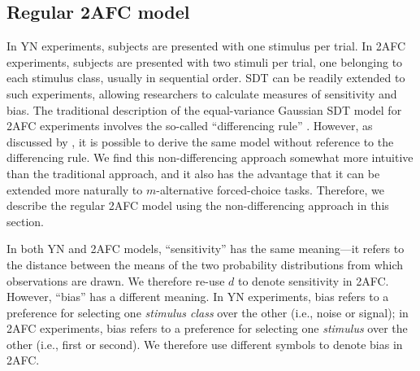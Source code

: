 \documentclass[man]{apa6}
\begin{document}
\subsection{Regular 2AFC model}
In YN experiments, subjects are presented with one stimulus per trial. In 2AFC experiments, subjects are presented with two stimuli per trial, one belonging to each stimulus class, usually in sequential order. SDT can be readily extended to such experiments, allowing researchers to calculate measures of sensitivity and bias. The traditional description of the equal-variance Gaussian SDT model for 2AFC experiments involves the so-called ``differencing rule'' \parencite[see][]{Macmillan2005}. However, as discussed by \textcite{decarloon2012}, it is possible to derive the same model without reference to the differencing rule. We find this non-differencing approach somewhat more intuitive than the traditional approach, and it also has the advantage that it can be extended more naturally to $m$-alternative forced-choice tasks. Therefore, we describe the regular 2AFC model using the non-differencing approach in this section.

In both YN and 2AFC models, ``sensitivity'' has the same meaning---it refers to the distance between the means of the two probability distributions from which observations are drawn. We therefore re-use $d$ to denote sensitivity in 2AFC. However, ``bias'' has a different meaning. In YN experiments, bias refers to a preference for selecting one \emph{stimulus class} over the other (i.e., noise or signal); in 2AFC experiments, bias refers to a preference for selecting one \emph{stimulus} over the other (i.e., first or second). We therefore use different symbols to denote bias in 2AFC.
\end{document}
